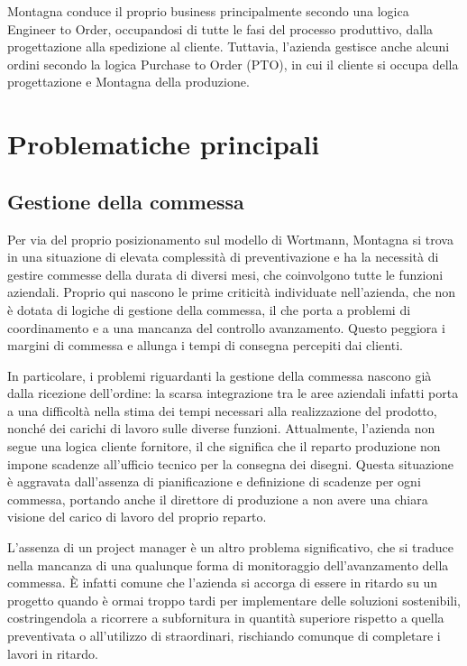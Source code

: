 \begin{multicols}{2}
	Montagna conduce il proprio business principalmente secondo una logica Engineer to Order, occupandosi di tutte le fasi del processo produttivo, dalla progettazione alla spedizione al cliente. Tuttavia, l'azienda gestisce anche alcuni ordini secondo la logica Purchase to Order (PTO), in cui il cliente si occupa della progettazione e Montagna della produzione.

\section{Problematiche principali}
\subsection{Gestione della commessa}
	Per via del proprio posizionamento sul modello di Wortmann, Montagna si trova in una situazione di elevata complessità di preventivazione e ha la necessità di gestire commesse della durata di diversi mesi, che coinvolgono tutte le funzioni aziendali. Proprio qui nascono le prime criticità individuate nell'azienda, che non è dotata di logiche di gestione della commessa, il che porta a problemi di coordinamento e a una mancanza del controllo avanzamento. Questo peggiora i margini di commessa e allunga i tempi di consegna percepiti dai clienti.

	In particolare, i problemi riguardanti la gestione della commessa nascono già dalla ricezione dell'ordine: la scarsa integrazione tra le aree aziendali infatti porta a una difficoltà nella stima dei tempi necessari alla realizzazione del prodotto, nonché dei carichi di lavoro sulle diverse funzioni. Attualmente, l'azienda non segue una logica cliente fornitore, il che significa che il reparto produzione non impone scadenze all'ufficio tecnico per la consegna dei disegni. Questa situazione è aggravata dall'assenza di pianificazione e definizione di scadenze per ogni commessa, portando anche il direttore di produzione a non avere una chiara visione del carico di lavoro del proprio reparto.

	L'assenza di un project manager è un altro problema significativo, che si traduce nella mancanza di una qualunque forma di monitoraggio dell'avanzamento della commessa. È infatti comune che l'azienda si accorga di essere in ritardo su un progetto quando è ormai troppo tardi per implementare delle soluzioni sostenibili, costringendola a ricorrere a subfornitura in quantità superiore rispetto a quella preventivata o all'utilizzo di straordinari, rischiando comunque di completare i lavori in ritardo.


\end{multicols}
